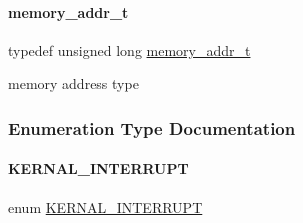 \paragraph{\texorpdfstring{memory\+\_\+addr\+\_\+t}{memory\_addr\_t}}
{\footnotesize\ttfamily typedef unsigned long \mbox{\hyperlink{a00020_a06da901348542a481c297d9b700e2001}{memory\+\_\+addr\+\_\+t}}}

memory address type 

\subsubsection{Enumeration Type Documentation}
\mbox{\label{a00020_a4ecccde27f29cedbe9bc6a22e3aad16f}} 
\paragraph{\texorpdfstring{K\+E\+R\+N\+A\+L\+\_\+\+I\+N\+T\+E\+R\+R\+U\+PT}{KERNAL\_INTERRUPT}}
{\footnotesize\ttfamily enum \mbox{\hyperlink{a00020_a4ecccde27f29cedbe9bc6a22e3aad16f}{K\+E\+R\+N\+A\+L\+\_\+\+I\+N\+T\+E\+R\+R\+U\+PT}}}

